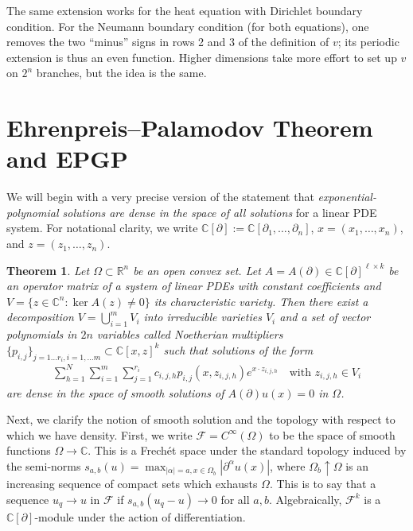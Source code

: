 \documentclass{article} %
\theoremstyle{plain}
\newtheorem{theorem}{Theorem}[section]
\theoremstyle{definition}
\theoremstyle{remark}
\newcommand{\CC}{\mathbb{C}}
\newcommand{\RR}{\mathbb{R}}
\begin{document}
The same extension works for the heat equation with Dirichlet boundary condition. For the Neumann boundary condition (for both equations), one removes the two ``minus'' signs in rows 2 and 3 of the definition of $v$; its periodic extension is thus an even function. Higher dimensions take more effort to set up $v$ on $2^n$ branches, but the idea is the same.


    \section{Ehrenpreis--Palamodov Theorem and EPGP}\label{sec:EPGP}
We will begin with a very precise version of the statement that \emph{exponential-polynomial solutions are dense in the space of all solutions} for a linear PDE system.
For notational clarity, we write $\CC[\partial]:=\CC[\partial_1,\ldots,\partial_n]$, $x=(x_1,\ldots,x_n)$, and $z=(z_1,\ldots,z_n)$.

\begin{theorem}
    Let  $\Omega\subset\RR^n$ be an open convex set. Let $A=A(\partial)\in \CC[\partial]^{\ell\times k}$ be an operator matrix of a system of linear PDEs with constant coefficients and $V=\{z\in\CC^n\colon \ker A(z)\neq 0\}$ its characteristic variety. 
    Then there exist a decomposition $V=\bigcup_{i=1}^m V_i$ into irreducible varieties $V_i$ and a set of vector polynomials in $2n$ variables called \textup{Noetherian multipliers} $\{p_{i,j}\}_{j=1\ldots r_i,i=1,\ldots m}\subset \CC[x,z]^{k}$   such that solutions of the form
    \begin{align}\tag{EP}\label{eq:EP}
\sum_{h=1}^N\sum_{i=1}^m\sum_{j=1}^{r_i}    c_{i,j,h} p_{i,j}(x,z_{i,j,h})e^{x\cdot z_{i,j,h}}\quad\text{with }z_{i,j,h}\in V_i
    \end{align}
    are dense in the space of smooth solutions of $A(\partial)u(x)=0$ in $\Omega$.
\end{theorem}
Next, we clarify the notion of smooth solution and the topology with respect to which we have density. First, we write $\mathcal F=C^\infty(\Omega)$ to be the space of smooth functions $\Omega\to\CC$. This is a Frech\'et space under the standard topology induced by the semi-norms $s_{a,b}(u)=\max_{|\alpha|=a,x\in\Omega_b}|\partial^\alpha u(x)|$, where $\Omega_b\uparrow\Omega$ is an increasing sequence of compact sets which exhausts $\Omega$. This is to say that a sequence $u_q\to u$ in $\mathcal F$ if $s_{a,b}(u_q-u)\to 0$ for all $a,b$. Algebraically,  $\mathcal F^k$ is a $\CC[\partial]$-module under the action of differentiation.
\end{document}
